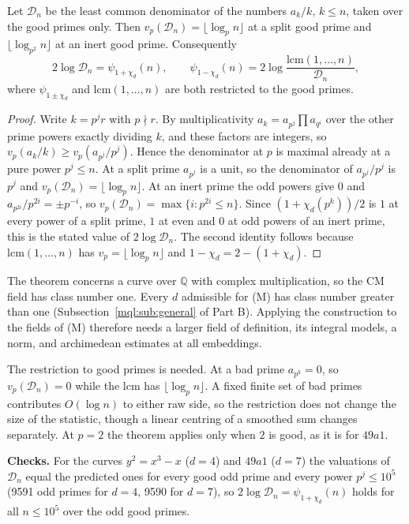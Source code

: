 \begin{theorem}\label{mqg:thm:lcmgen}
Let $\mathcal D_n$ be the least common denominator of the numbers $a_k/k$, $k\le n$, taken over the good primes only. Then $v_p(\mathcal D_n)=\lfloor\log_pn\rfloor$ at a split good prime and $\lfloor\log_{p^2}n\rfloor$ at an inert good prime. Consequently
\[
2\log\mathcal D_n=\psi_{1+\chi_d}(n),\qquad\psi_{1-\chi_d}(n)=2\log\frac{\mathrm{lcm}(1,\dots,n)}{\mathcal D_n},
\]
where $\psi_{1\pm\chi_d}$ and $\mathrm{lcm}(1,\dots,n)$ are both restricted to the good primes.
\end{theorem}

\begin{proof}
Write $k=p^jr$ with $p\nmid r$. By multiplicativity $a_k=a_{p^j}\prod a_{q^i}$ over the other prime powers exactly dividing $k$, and these factors are integers, so $v_p(a_k/k)\ge v_p(a_{p^j}/p^j)$. Hence the denominator at $p$ is maximal already at a pure power $p^j\le n$. At a split prime $a_{p^j}$ is a unit, so the denominator of $a_{p^j}/p^j$ is $p^j$ and $v_p(\mathcal D_n)=\lfloor\log_pn\rfloor$. At an inert prime the odd powers give $0$ and $a_{p^{2i}}/p^{2i}=\pm p^{-i}$, so $v_p(\mathcal D_n)=\max\{i:p^{2i}\le n\}$. Since $(1+\chi_d(p^k))/2$ is $1$ at every power of a split prime, $1$ at even and $0$ at odd powers of an inert prime, this is the stated value of $2\log\mathcal D_n$. The second identity follows because $\mathrm{lcm}(1,\dots,n)$ has $v_p=\lfloor\log_pn\rfloor$ and $1-\chi_d=2-(1+\chi_d)$.
\end{proof}

The theorem concerns a curve over $\mathbb Q$ with complex multiplication, so the CM field has class number one. Every $d$ admissible for (M) has class number greater than one (Subsection~\ref{mql:sub:general} of Part B). Applying the construction to the fields of (M) therefore needs a larger field of definition, its integral models, a norm, and archimedean estimates at all embeddings.

The restriction to good primes is needed. At a bad prime $a_{p^k}=0$, so $v_p(\mathcal D_n)=0$ while the lcm has $\lfloor\log_pn\rfloor$. A fixed finite set of bad primes contributes $O(\log n)$ to either raw side, so the restriction does not change the size of the statistic, though a linear centring of a smoothed sum changes separately. At $p=2$ the theorem applies only when $2$ is good, as it is for $49a1$.

\textbf{Checks.} For the curves $y^2=x^3-x$ ($d=4$) and $49a1$ ($d=7$) the valuations of $\mathcal D_n$ equal the predicted ones for every good odd prime and every power $p^j\le10^5$ (9591 odd primes for $d=4$, 9590 for $d=7$), so $2\log\mathcal D_n=\psi_{1+\chi_d}(n)$ holds for all $n\le10^5$ over the odd good primes.

